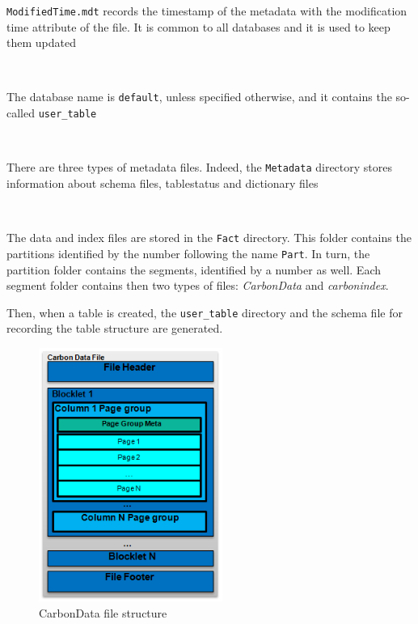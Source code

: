 \documentclass[10pt, a4paper]{report}
\begin{document}
\begin{itemize}
	\begin{minipage}{0.92\textwidth}
		\item \texttt{ModifiedTime.mdt} records the timestamp of the metadata with the modification time attribute of the file. It is common to all databases and it is used to keep them updated \\
	\end{minipage} \\
	\begin{minipage}{0.92\textwidth}
		\item The database name is \texttt{default}, unless specified otherwise, and it contains the so-called \texttt{user\_table} \\
	\end{minipage} \\
	\begin{minipage}{0.92\textwidth}
		\item There are three types of metadata files. Indeed, the \texttt{Metadata} directory stores information about schema files, tablestatus and dictionary files \\
	\end{minipage} \\
	\begin{minipage}{0.92\textwidth}
		\item The data and index files are stored in the \texttt{Fact} directory. This folder contains the partitions identified by the number following the name \texttt{Part}. In turn, the partition folder contains the segments, identified by a number as well. Each segment folder contains then two types of files: \textit{CarbonData} and \textit{carbonindex}.\\
	\end{minipage}
\end{itemize}

Then, when a table is created, the \texttt{user\_table} directory and the schema file for recording the table structure are generated.

\begin{figure}
	\centering
	\includegraphics[width=6cm]{./assets/img/carbondata/carbondata_file_structure.png}
	\caption{CarbonData file structure}
	\label{fig:carbondata_file_structure}
	\vspace{0.5cm}
\end{figure}
\end{document}
